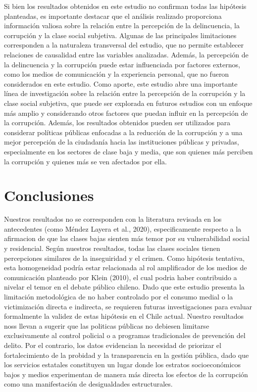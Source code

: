 \documentclass[
  spanish,
  a4paper,
  oneside]{scrbook}
\begin{document}
Si bien los resultados obtenidos en este estudio no confirman todas las
hipótesis planteadas, es importante destacar que el análisis realizado
proporciona información valiosa sobre la relación entre la percepción de
la delincuencia, la corrupción y la clase social subjetiva. Algunas de
las principales limitaciones corresponden a la naturaleza transversal
del estudio, que no permite establecer relaciones de causalidad entre
las variables analizadas. Además, la percepción de la delincuencia y la
corrupción puede estar influenciada por factores externos, como los
medios de comunicación y la experiencia personal, que no fueron
considerados en este estudio. Como aporte, este estudio abre una
importante línea de investigación sobre la relación entre la percepción
de la corrupción y la clase social subjetiva, que puede ser explorada en
futuros estudios con un enfoque más amplio y considerando otros factores
que puedan influir en la percepción de la corrupción. Además, los
resultados obtenidos pueden ser utilizados para considerar políticas
públicas enfocadas a la reducción de la corrupción y a una mejor
percepción de la ciudadanía hacia las instituciones públicas y privadas,
especialmente en los sectores de clase baja y media, que son quienes más
perciben la corrupción y quienes más se ven afectados por ella.


\chapter{Conclusiones}\label{conclusiones}

Nuestros resultados no se corresponden con la literatura revisada en los
antecedentes (como Méndez Layera et al., 2020), especificamente respecto
a la afirmacion de que las clases bajas sienten más temor por su
vulnerabilidad social y residencial. Según nuestros resultados, todas
las clases sociales tienen percepciones similares de la inseguiridad y
el crimen. Como hipótesis tentativa, esta homogeneidad podría estar
relacionada al rol amplificador de los medios de comunicación planteado
por Klein (2010), el cual podria haber contribuido a nivelar el temor en
el debate público chileno. Dado que este estudio presenta la limitación
metodológica de no haber controlado por el consumo medial o la
victimización directa e indirecta, se requieren futuras investigaciones
para evaluar formalmente la validez de estas hipótesis en el Chile
actual. Nuestro resultados noss llevan a sugerir que las politicas
públicas no debiesen limitarse exclusivamente al control policial o a
programas tradicionales de prevención del delito. Por el contrario, los
datos evidencian la necesidad de priorizar el fortalecimiento de la
probidad y la transparencia en la gestión pública, dado que los
servicios estatales constituyen un lugar donde los estratos
socioeconómicos bajos y medios experimentan de manera más directa los
efectos de la corrupción como una manifestación de desigualdades
estructurales.
\end{document}
